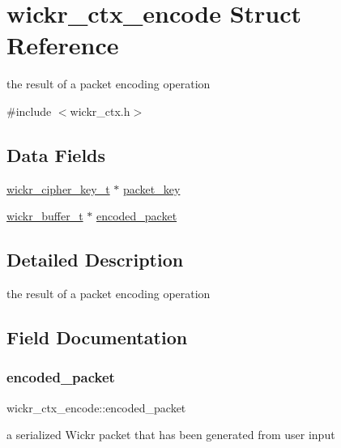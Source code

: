 \hypertarget{structwickr__ctx__encode}{}\section{wickr\+\_\+ctx\+\_\+encode Struct Reference}
\label{structwickr__ctx__encode}


the result of a packet encoding operation  




{\ttfamily \#include $<$wickr\+\_\+ctx.\+h$>$}

\subsection*{Data Fields}
\begin{DoxyCompactItemize}
\item 
\mbox{\hyperlink{structwickr__cipher__key}{wickr\+\_\+cipher\+\_\+key\+\_\+t}} $\ast$ \mbox{\hyperlink{structwickr__ctx__encode_af96f392d9f5081e3c229d0342f71d629}{packet\+\_\+key}}
\item 
\mbox{\hyperlink{structwickr__buffer}{wickr\+\_\+buffer\+\_\+t}} $\ast$ \mbox{\hyperlink{structwickr__ctx__encode_ac83f0d28849ec047ccf8fb4b14319ad9}{encoded\+\_\+packet}}
\end{DoxyCompactItemize}


\subsection{Detailed Description}
the result of a packet encoding operation 

\subsection{Field Documentation}
\mbox{\label{structwickr__ctx__encode_ac83f0d28849ec047ccf8fb4b14319ad9}} 
\subsubsection{\texorpdfstring{encoded\+\_\+packet}{encoded\_packet}}
{\footnotesize\ttfamily wickr\+\_\+ctx\+\_\+encode\+::encoded\+\_\+packet}

a serialized Wickr packet that has been generated from user input \mbox{\label{structwickr__ctx__encode_af96f392d9f5081e3c229d0342f71d629}} 
